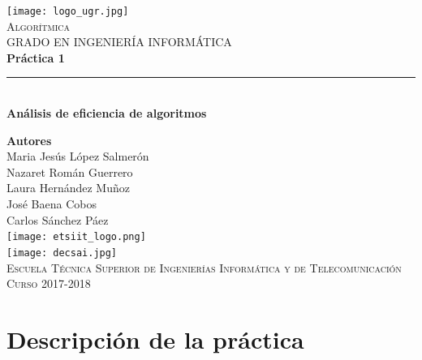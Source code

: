 \documentclass[12pt,spanish]{article}
\begin{document}
\begin{titlepage}

\newlength{\centeroffset}
\setlength{\centeroffset}{-0.5\oddsidemargin}
\addtolength{\centeroffset}{0.5\evensidemargin}
\thispagestyle{empty}

\noindent\hspace*{\centeroffset}
\begin{minipage}{\textwidth}

\centering
\texttt{[image: logo\_ugr.jpg]}\\[1.4cm]

\textsc{ \Large Algorítmica\\[0.2cm]}
\textsc{GRADO EN INGENIERÍA INFORMÁTICA}\\[1cm]

{\Huge\bfseries Práctica 1\\}
\noindent\rule[-1ex]{\textwidth}{3pt}\\[3.5ex]
{\large\bfseries Análisis de eficiencia de algoritmos}
\end{minipage}

\vspace{1.5cm}
\noindent\hspace*{\centeroffset}
\begin{minipage}{\textwidth}
\centering

\textbf{Autores}\\ {Maria Jesús López Salmerón \\ Nazaret Román Guerrero \\ Laura Hernández Muñoz \\ José Baena Cobos  \\ Carlos Sánchez Páez}\\[2.5ex]
\texttt{[image: etsiit\_logo.png]}\\[0.1cm]
\vspace{1.5cm}
\texttt{[image: decsai.jpg]}\\[0.1cm]
\vspace{1cm}
\textsc{Escuela Técnica Superior de Ingenierías Informática y de Telecomunicación}\\
\vspace{1cm}
\textsc{Curso 2017-2018}
\end{minipage}
\end{titlepage}
\tableofcontents
\thispagestyle{empty}
\listoftables
\newpage
\setcounter{page}{1}
\section{Descripción de la práctica}
\end{document}
